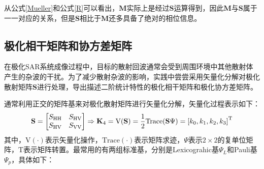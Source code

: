 从公式\eqref{Mueller}和公式\eqref{R}可以看出，$\textbf{M}$实际上是经过$\textbf{S}$运算得到，因此$\textbf{M}$与$\textbf{S}$属于一一对应的关系，但是$\textbf{S}$相比于$\textbf{M}$还多具备了绝对的相位信息。

\subsection{极化相干矩阵和协方差矩阵}
在极化SAR系统成像过程中，目标的散射回波通常会受到周围环境中其他散射体产生的杂波的干扰。为了减少散射杂波的影响，实践中尝尝采用矢量化分解对极化散射矩阵$\textbf{S}$进行处理，导出描述二阶统计特性的极化相干矩阵和极化协方差矩阵。

通常利用正交的矩阵基来对极化散射矩阵进行矢量化分解，矢量化过程表示如下：
\begin{equation}
    \textbf{S}=\left[ \begin{matrix}
            S_{\mathrm{HH}} & S_{\mathrm{HV}} \\
            S_{\mathrm{HV}} & S_{\mathrm{VV}} \\
        \end{matrix} \right] \Rightarrow \textbf{K}_4=\text{V(\textbf{S})}=\frac{1}{2}\mathrm{Trace(}\textbf{S}\Psi )=\left[ k_0,k_1,k_2,k_3 \right] ^\mathrm{T}
\end{equation}
其中，$\text{V}(\cdot)$表示矢量化操作，$\text{Trace}(\cdot)$表示矩阵求迹，$\Psi$表示$2\times2$的复单位矩阵，$\mathrm{T}$表示矩阵转置。最常用的有两组标准基，分别是Lexicograhic基$\Psi_L$和Pauli基$\Psi_p$，具体如下：
